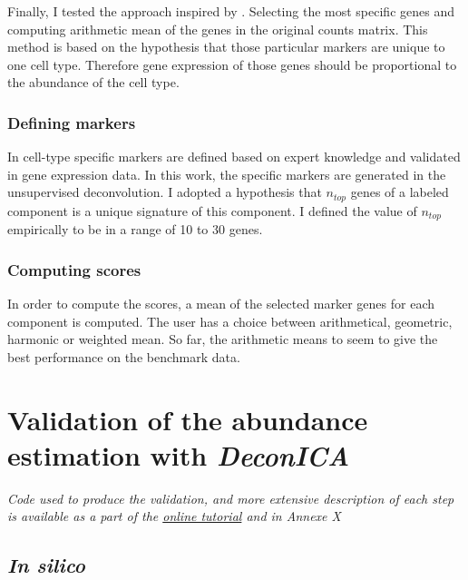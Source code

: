 \documentclass[12pt,]{book}
\theoremstyle{definition}
\theoremstyle{definition}
\theoremstyle{definition}
\theoremstyle{remark}
\begin{document}
Finally, I tested the approach inspired by \citep{Becht2016}. Selecting
the most specific genes and computing arithmetic mean of the genes in
the original counts matrix. This method is based on the hypothesis that
those particular markers are unique to one cell type. Therefore gene
expression of those genes should be proportional to the abundance of the
cell type.

\hypertarget{defining-markers}{%
\subsubsection{Defining markers}\label{defining-markers}}

In \citep{Becht2016} cell-type specific markers are defined based on
expert knowledge and validated in gene expression data. In this work,
the specific markers are generated in the unsupervised deconvolution. I
adopted a hypothesis that \(n_{top}\) genes of a labeled component is a
unique signature of this component. I defined the value of \(n_{top}\)
empirically to be in a range of 10 to 30 genes.

\hypertarget{computing-scores}{%
\subsubsection{Computing scores}\label{computing-scores}}

In order to compute the scores, a mean of the selected marker genes for
each component is computed. The user has a choice between arithmetical,
geometric, harmonic or weighted mean. So far, the arithmetic means to
seem to give the best performance on the benchmark data.

\hypertarget{validation-of-the-abundance-estimation-with-deconica}{%
\section{\texorpdfstring{Validation of the abundance estimation with
\emph{DeconICA}}{Validation of the abundance estimation with DeconICA}}\label{validation-of-the-abundance-estimation-with-deconica}}

\emph{Code used to produce the validation, and more extensive
description of each step is available as a part of the
\href{https://urszulaczerwinska.github.io/DeconICA/DeconICA_introduction.html}{online
tutorial} and in Annexe X}

\hypertarget{in-silico}{%
\subsection{\texorpdfstring{\emph{In
silico}}{In silico}}\label{in-silico}}
\end{document}
